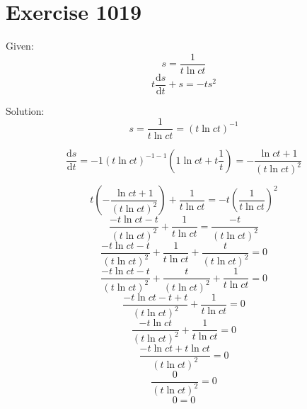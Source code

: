 \documentclass[a4paper, 10pt]{scrartcl}
\newcommand*\deriv{\mathrm{d}}
\begin{document}
\section{Exercise 1019}

Given:
\[
s = \frac{1}{t\ln{ct}}
\]
\[
t\frac{\deriv s}{\deriv t} + s = -ts^{2}
\]

Solution:
\[
s = \frac{1}{t\ln{ct}} = (t\ln{ct})^{-1}
\]

\[
\frac{\deriv s}{\deriv t} = -1(t\ln{ct})^{-1 - 1}(1\ln{ct} + t\frac{1}{t}) = -\frac{\ln{ct} + 1}{(t\ln{ct})^{2}}
\]

\[
t\left(-\frac{\ln{ct} + 1}{(t\ln{ct})^{2}}\right) + \frac{1}{t\ln{ct}} = -t\left(\frac{1}{t\ln{ct}}\right)^{2}
\]
\[
\frac{-t\ln{ct} - t}{(t\ln{ct})^{2}} + \frac{1}{t\ln{ct}} = \frac{-t}{(t\ln{ct})^{2}}
\]
\[
\frac{-t\ln{ct} - t}{(t\ln{ct})^{2}} + \frac{1}{t\ln{ct}} + \frac{t}{(t\ln{ct})^{2}} = 0
\]
\[
\frac{-t\ln{ct} - t}{(t\ln{ct})^{2}} + \frac{t}{(t\ln{ct})^{2}} + \frac{1}{t\ln{ct}}= 0
\]
\[
\frac{-t\ln{ct} - t + t}{(t\ln{ct})^{2}} + \frac{1}{t\ln{ct}}= 0
\]
\[
\frac{-t\ln{ct}}{(t\ln{ct})^{2}} + \frac{1}{t\ln{ct}}= 0
\]
\[
\frac{-t\ln{ct} + t\ln{ct}}{(t\ln{ct})^{2}} = 0
\]
\[
\frac{0}{(t\ln{ct})^{2}} = 0
\]
\[
0 = 0
\]
\end{document}
